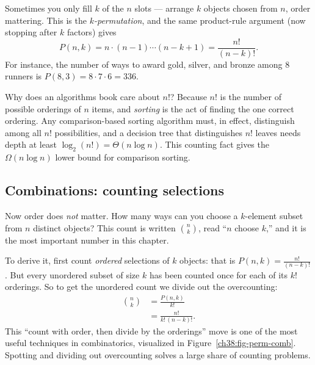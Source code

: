Sometimes you only fill $k$ of the $n$ slots --- arrange $k$ objects chosen from $n$,
order mattering. This is the \emph{$k$-permutation}, and the same product-rule
argument (now stopping after $k$ factors) gives
\[
P(n, k) = n \cdot (n-1) \cdots (n-k+1) = \frac{n!}{(n-k)!}.
\]
For instance, the number of ways to award gold, silver, and bronze among $8$ runners
is $P(8,3) = 8 \cdot 7 \cdot 6 = 336$.

\begin{aestheticbox}
Why does an algorithms book care about $n!$? Because $n!$ is the number of possible
orderings of $n$ items, and \emph{sorting} is the act of finding the one correct
ordering. Any comparison-based sorting algorithm must, in effect, distinguish among
all $n!$ possibilities, and a decision tree that distinguishes $n!$ leaves needs depth
at least $\log_2(n!) = \Theta(n \log n)$. This counting fact gives the
$\Omega(n\log n)$ lower bound for comparison sorting.
\end{aestheticbox}

\subsection{Combinations: counting selections}

Now order does \emph{not} matter. How many ways can you choose a $k$-element subset
from $n$ distinct objects? This count is written $\binom{n}{k}$, read ``$n$ choose
$k$,'' and it is the most important number in this chapter.

To derive it, first count \emph{ordered} selections of $k$ objects:
that is $P(n,k) = \tfrac{n!}{(n-k)!}$. But every unordered subset of size $k$ has been
counted once for each of its $k!$ orderings. So to get the unordered count we divide
out the overcounting:
\begin{align*}
\binom{n}{k} &= \frac{P(n,k)}{k!} \\
&= \frac{n!}{k!\,(n-k)!}.
\end{align*}
This ``count with order, then divide by the orderings'' move is one of the most
useful techniques in combinatorics, visualized in Figure~\ref{ch38:fig-perm-comb}.
Spotting and dividing out overcounting solves a large share of counting problems.

